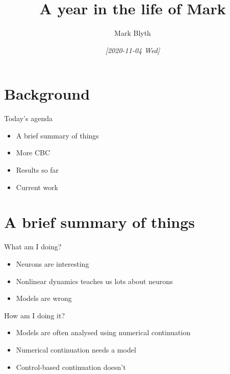 \documentclass[presentation]{beamer}
\author{Mark Blyth}
\date{\textit{[2020-11-04 Wed]}}
\title{A year in the life of Mark}
\begin{document}
\maketitle

\section{Background}
\label{sec:orgfa19b5e}
\begin{frame}[label={sec:org6723c6d}]{Today's agenda}
\begin{itemize}
\item \alert{A brief summary of things}
\end{itemize}
\vfill
\begin{itemize}
\item More CBC
\end{itemize}
\vfill
\begin{itemize}
\item Results so far
\end{itemize}
\vfill
\begin{itemize}
\item Current work
\end{itemize}
\vfill
\end{frame}

\section{A brief summary of things}
\label{sec:org34d4b2b}
\begin{frame}[label={sec:org9f9db64}]{What am I doing?}
\begin{itemize}
\item Neurons are interesting
\end{itemize}
\vfill
\begin{itemize}
\item Nonlinear dynamics teaches us lots about neurons
\end{itemize}
\vfill
\begin{itemize}
\item Models are wrong
\end{itemize}
\end{frame}

\begin{frame}[label={sec:orged16b1e}]{How am I doing it?}
\begin{itemize}
\item Models are often analysed using numerical continuation
\end{itemize}
\vfill
\begin{itemize}
\item Numerical continuation needs a model
\end{itemize}
\vfill
\begin{itemize}
\item Control-based continuation doesn't
\end{itemize}
\end{frame}
\end{document}

